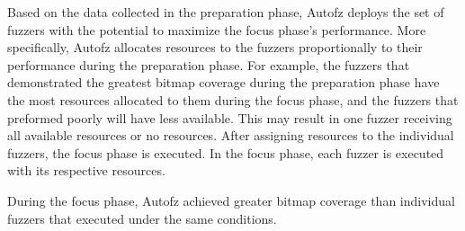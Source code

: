 Based on the data collected in the preparation phase, Autofz deploys the set of fuzzers with the potential to maximize the focus phase’s performance. More specifically, Autofz allocates resources to the fuzzers proportionally to their performance during the preparation phase. For example, the fuzzers that demonstrated the greatest bitmap coverage during the preparation phase have the most resources allocated to them during the focus phase, and the fuzzers that preformed poorly will have less available. This may result in one fuzzer receiving all available resources or no resources. After assigning resources to the individual fuzzers, the focus phase is executed. In the focus phase, each fuzzer is executed with its respective resources.

During the focus phase, Autofz achieved greater bitmap coverage than individual fuzzers that executed under the same conditions.
\cite{Fu}
